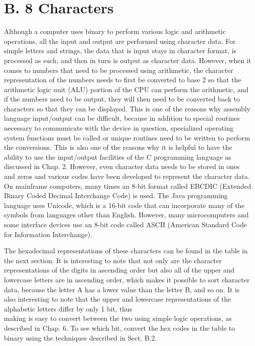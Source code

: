 \documentclass[10pt]{book}
\begin{document}
\section*{B. 8 Characters}
Although a computer uses binary to perform various logic and arithmetic operations, all the input and output are performed using character data. For simple letters and strings, the data that is input stays in character format, is processed as such, and then in turn is output as character data. However, when it comes to numbers that need to be processed using arithmetic, the character representation of the numbers needs to first be converted to base 2 so that the arithmetic logic unit (ALU) portion of the CPU can perform the arithmetic, and if the numbers need to be output, they will then need to be converted back to characters so that they can be displayed. This is one of the reasons why assembly language input/output can be difficult, because in addition to special routines necessary to communicate with the device in question, specialized operating system functions must be called or unique routines need to be written to perform the conversions. This is also one of the reasons why it is helpful to have the ability to use the input/output facilities of the C programming language as discussed in Chap. 2. However, even character data needs to be stored in ones and zeros and various codes have been developed to represent the character data. On mainframe computers, many times an 8-bit format called EBCDIC (Extended Binary Coded Decimal Interchange Code) is used. The Java programming language uses Unicode, which is a 16-bit code that can incorporate many of the symbols from languages other than English. However, many microcomputers and some interface devices use an 8-bit code called ASCII (American Standard Code for Information Interchange).

The hexadecimal representations of these characters can be found in the table in the next section. It is interesting to note that not only are the character representations of the digits in ascending order but also all of the upper and lowercase letters are in ascending order, which makes it possible to sort character data, because the letter A has a lower value than the letter B, and so on. It is also interesting to note that the upper and lowercase representations of the alphabetic letters differ by only 1 bit, thus\\
making is easy to convert between the two using simple logic operations, as described in Chap. 6. To see which bit, convert the hex codes in the table to binary using the techniques described in Sect. B.2.
\end{document}
